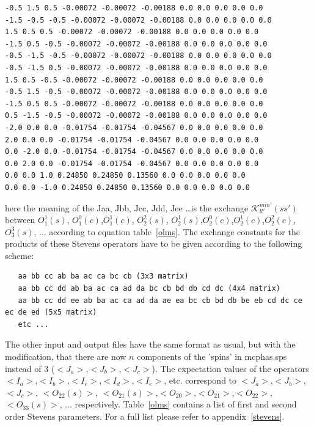{\begin{verbatim}
-0.5 1.5 0.5 -0.00072 -0.00072 -0.00188 0.0 0.0 0.0 0.0 0.0 
-1.5 -0.5 -0.5 -0.00072 -0.00072 -0.00188 0.0 0.0 0.0 0.0 0.0 
1.5 0.5 0.5 -0.00072 -0.00072 -0.00188 0.0 0.0 0.0 0.0 0.0 
-1.5 0.5 -0.5 -0.00072 -0.00072 -0.00188 0.0 0.0 0.0 0.0 0.0 
-0.5 -1.5 -0.5 -0.00072 -0.00072 -0.00188 0.0 0.0 0.0 0.0 0.0 
-0.5 -1.5 0.5 -0.00072 -0.00072 -0.00188 0.0 0.0 0.0 0.0 0.0 
1.5 0.5 -0.5 -0.00072 -0.00072 -0.00188 0.0 0.0 0.0 0.0 0.0 
-0.5 1.5 -0.5 -0.00072 -0.00072 -0.00188 0.0 0.0 0.0 0.0 0.0 
-1.5 0.5 0.5 -0.00072 -0.00072 -0.00188 0.0 0.0 0.0 0.0 0.0 
0.5 -1.5 -0.5 -0.00072 -0.00072 -0.00188 0.0 0.0 0.0 0.0 0.0 
-2.0 0.0 0.0 -0.01754 -0.01754 -0.04567 0.0 0.0 0.0 0.0 0.0 
2.0 0.0 0.0 -0.01754 -0.01754 -0.04567 0.0 0.0 0.0 0.0 0.0 
0.0 -2.0 0.0 -0.01754 -0.01754 -0.04567 0.0 0.0 0.0 0.0 0.0 
0.0 2.0 0.0 -0.01754 -0.01754 -0.04567 0.0 0.0 0.0 0.0 0.0 
0.0 0.0 1.0 0.24850 0.24850 0.13560 0.0 0.0 0.0 0.0 0.0 
0.0 0.0 -1.0 0.24850 0.24850 0.13560 0.0 0.0 0.0 0.0 0.0 
\end{verbatim}
}
here the meaning of the Jaa, Jbb, Jcc, Jdd, Jee \dots is the exchange ${\mathcal K}_{ll'}^{mm'}(ss')$ between %
$O_1^1(s)$, $O_1^0(c)$,$O_1^1(c)$, $O_2^2(s)$, $O_2^1(s)$,$O_2^0(c)$,$O_2^1(c)$,$O_2^2(c)$,$O_3^3(s)$, ...
according to equation table~\ref{olms}.
 The exchange constants for the
products of these Stevens operators have to be 
given according to the following scheme:

\begin{verbatim}
   aa bb cc ab ba ac ca bc cb (3x3 matrix)
   aa bb cc dd ab ba ac ca ad da bc cb bd db cd dc (4x4 matrix)
   aa bb cc dd ee ab ba ac ca ad da ae ea bc cb bd db be eb cd dc ce ec de ed (5x5 matrix)
   etc ...
\end{verbatim}

The other input and output files have the same format as usual, but with the modification, that
there are now $n$ components of the 'spins' in {\prg mcphas.sps} instead of 3 ($<J_a>$,$<J_b>$,$<J_c>$).
The expectation values of the operators
 $<I_a>$,$<I_b>$,$<I_c>$,$<I_d>$,$<I_e>$, etc. correspond to $<J_a>$,$<J_b>$,$<J_c>$,
 $<O_{22}(s)>$, $<O_{21}(s)>$,$<O_{20}>$,$<O_{21}>$,$<O_{22}>$,$<O_{33}(s)>$, ...
 respectively. Table~\ref{olms} contains a list of first and second order Stevens parameters.
For a full list please refer to appendix~\ref{stevens}.

